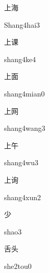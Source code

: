 \begin{multicols*}{2}
\begin{verbete}{上海}
\begin{pronuncia}{Shang4hai3}
\end{pronuncia}
\end{verbete}

\begin{verbete}[shang4ke4]{上课}
\begin{pronuncia}{shang4ke4}
\end{pronuncia}
\end{verbete}

\begin{verbete}{上面}
\begin{pronuncia}{shang4mian0}
\end{pronuncia}
\end{verbete}

\begin{verbete}{上网}
\begin{pronuncia}{shang4wang3}
\end{pronuncia}
\end{verbete}

\begin{verbete}[shang4wu3]{上午}
\begin{pronuncia}{shang4wu3}
\end{pronuncia}
\end{verbete}

\begin{verbete}{上询}
\begin{pronuncia}{shang4xun2}
\end{pronuncia}
\end{verbete}

\begin{verbete}[shao3]{少}
\begin{pronuncia}{shao3}
\end{pronuncia}
\end{verbete}

\begin{verbete}{舌头}
\begin{pronuncia}{she2tou0}
\end{pronuncia}
\end{verbete}


\end{multicols*}
